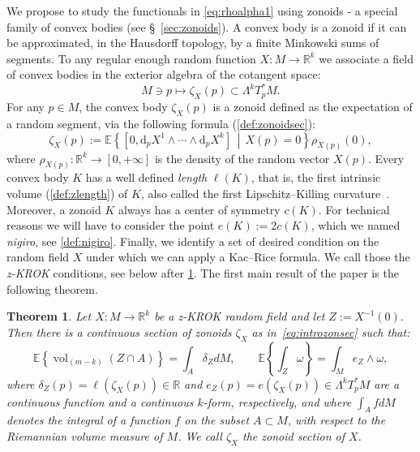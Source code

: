 \documentclass[AHL, Unicode, longabstracts, published]{cedram}
\newtheorem{mainthm}{Theorem}
\newcommand{\R}{\mathbb{R}}
\newcommand{\EE}{\mathbb{E}}
\newcommand{\dd}{\mathrm{d}}
\DeclareMathOperator{\vol}{vol}
\newcommand{\zkrok}{\emph{z-KROK}\xspace}
\begin{document}
We propose to study the functionals in \eqref{eq:rhoalpha1} using zonoids - a special family of convex bodies (see \S~\ref{sec:zonoids}). A convex body is a zonoid if it can be approximated, in the Hausdorff topology, by a finite Minkowski sums of segments. To any regular enough random function $X\colon M\to \R^k$ we associate a field of convex bodies in the exterior algebra of the cotangent space:
\begin{equation*}
M\ni p\mapsto \zeta_X(p)\subset \Lambda^kT^*_pM.
\end{equation*}
For any $p\in M$, the convex body $\zeta_X(p)$ is a zonoid defined as the expectation of a random segment, via the following formula (\cref{def:zonoidsec}):
\begin{equation}\label{eq:introzonsec}
\zeta_X(p):=\EE\left\{\left[0,\dd_pX^1\wedge\cdots\wedge\dd_p X^k\right]\,\middle|\,X(p)=0\right\}\rho_{X(p)}(0),
\end{equation}
where $\rho_{X(p)}:\R^k\to [0,+\infty]$ is the density of the random vector $X(p)$. Every convex body $K$ has a well defined \emph{length} $\ell(K)$, that is, the first intrinsic volume (\cref{def:zlength}) of $K$, also called the first Lipschitz--Killing curvature~\cite{AdlerTaylor}. Moreover, a zonoid $K$ always has a center of symmetry $c(K)$. For technical reasons we will have to consider the point $e(K):=2c(K)$, which we named \emph{nigiro}, see \cref{def:nigiro}. Finally, we identify a set of desired condition on the random field $X$ under which we can apply a Kac--Rice formula. We call those the \zkrok conditions, see below after \cref{thm:1}. The first main result of the paper is the following theorem.

\begin{mainthm}\label{thm:1}
Let $X\colon M \to \R^k$ be a \zkrok random field and let $Z:=X^{-1}(0)$. Then there is a continuous section of zonoids $\zeta_X$ as in~\eqref{eq:introzonsec} such that:
\begin{equation}\label{eq:rhoalpha}
\EE\left\{\vol_{(m-k)}(Z\cap A)\right\}=\int_A \delta_Z dM, \qquad \EE\left\{\int_{Z} \omega\right\}=\int_M e_Z\wedge \omega,
\end{equation}
where $\delta_Z(p)=\ell(\zeta_X(p))\in \R$ and $e_Z(p)=e(\zeta_X(p))\in \Lambda^kT^*_pM$ are a continuous function and a continuous $k$-form, respectively, and where $\int_AfdM$ denotes the integral of a function $f$ on the subset $A\subset M$, with respect to the Riemannian volume measure of $M$. We call $\zeta_X$ the \emph{zonoid section} of $X$.
\end{mainthm}
\end{document}
